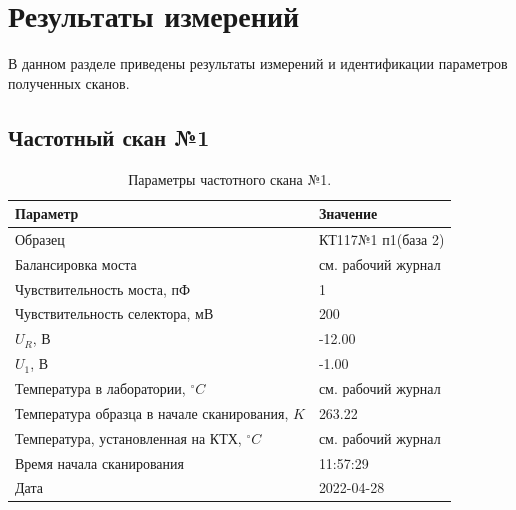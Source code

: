 

\section{Результаты измерений}
В данном разделе приведены результаты измерений и идентификации параметров полученных сканов.
\subsection{Частотный скан №1}
\begin{table}[!ht]
    \centering
    \caption{Параметры частотного скана №1.}
    \begin{tabular}{|l|l|}
        \hline
        Параметр                                       & Значение                  \\ \hline
        Образец                                        & КТ117№1 п1(база 2)        \\ \hline
        Балансировка моста                             & см. рабочий журнал        \\ \hline
        Чувствительность моста, пФ                     & 1                         \\ \hline
        Чувствительность селектора, мВ                 & 200                       \\ \hline
        $U_R$, В                                       & -12.00                    \\ \hline
        $U_1$, В                                       & -1.00                     \\ \hline
        Температура в лаборатории, $^\circ C$          & см. рабочий журнал        \\ \hline
        Температура образца в начале сканирования, $K$ & 263.22                    \\ \hline
        Температура, установленная на КТХ, $^\circ C$  & см. рабочий журнал        \\ \hline
        Время начала сканирования                      & 11:57:29                  \\ \hline
        Дата                                           & 2022-04-28                \\ \hline
    \end{tabular}
    \label{table:frequency_scan_1}
\end{table}

